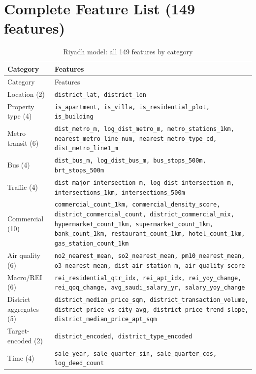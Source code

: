 \documentclass[11pt, a4paper, twoside]{report}
\begin{document}
\section{Complete Feature List (149 features)}
\begin{longtable}{lp{10cm}}
  \caption{Riyadh model: all 149 features by category} \\
  \toprule Category & Features \\ \midrule \endfirsthead
  \midrule Category & Features \\ \midrule \endhead \bottomrule \endfoot
  Location (2)            & \texttt{district\_lat, district\_lon} \\
  Property type (4)       & \texttt{is\_apartment, is\_villa, is\_residential\_plot, is\_building} \\
  Metro transit (6)       & \texttt{dist\_metro\_m, log\_dist\_metro\_m, metro\_stations\_1km, nearest\_metro\_line\_num, nearest\_metro\_type\_cd, dist\_metro\_line1\_m} \\
  Bus (4)                 & \texttt{dist\_bus\_m, log\_dist\_bus\_m, bus\_stops\_500m, brt\_stops\_500m} \\
  Traffic (4)             & \texttt{dist\_major\_intersection\_m, log\_dist\_intersection\_m, intersections\_1km, intersections\_500m} \\
  Commercial (10)         & \texttt{commercial\_count\_1km, commercial\_density\_score, district\_commercial\_count, district\_commercial\_mix, hypermarket\_count\_1km, supermarket\_count\_1km, bank\_count\_1km, restaurant\_count\_1km, hotel\_count\_1km, gas\_station\_count\_1km} \\
  Air quality (6)         & \texttt{no2\_nearest\_mean, so2\_nearest\_mean, pm10\_nearest\_mean, o3\_nearest\_mean, dist\_air\_station\_m, air\_quality\_score} \\
  Macro/REI (6)           & \texttt{rei\_residential\_qtr\_idx, rei\_apt\_idx, rei\_yoy\_change, rei\_qoq\_change, avg\_saudi\_salary\_yr, salary\_yoy\_change} \\
  District aggregates (5) & \texttt{district\_median\_price\_sqm, district\_transaction\_volume, district\_price\_vs\_city\_avg, district\_price\_trend\_slope, district\_median\_price\_apt\_sqm} \\
  Target-encoded (2)      & \texttt{district\_encoded, district\_type\_encoded} \\
  Time (4)                & \texttt{sale\_year, sale\_quarter\_sin, sale\_quarter\_cos, log\_deed\_count} \\

\end{longtable}
\end{document}
